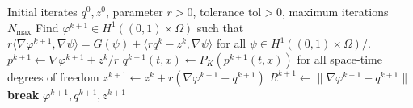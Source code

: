 \begin{algorithm}[H]
\caption{ALG2 for quadratic dynamical optimal transport}
\label{alg:bb_alg2}
\begin{algorithmic}[1]
    \Require Initial iterates $q^0,z^0$, parameter $r>0$,
             tolerance $\mathrm{tol}>0$, maximum iterations $N_{\max}$
        \State Find $\varphi^{k+1}\in H^1((0,1)\times\Omega)$ such that
        \Statex \hspace{1em}$r\langle \nabla\varphi^{k+1},\nabla\psi\rangle
          =G(\psi)+\langle rq^k-z^k,\nabla\psi\rangle$
          for all $\psi\in H^1((0,1)\times\Omega)/$.
        \State $p^{k+1}\gets \nabla\varphi^{k+1}+z^k/r$
        \State $q^{k+1}(t,x)\gets P_K(p^{k+1}(t,x))$
               for all space-time degrees of freedom %
        \State $z^{k+1}\gets z^k+r(\nabla\varphi^{k+1}-q^{k+1})$
        \State $R^{k+1}\gets\|\nabla\varphi^{k+1}-q^{k+1}\|$
            \State \textbf{break}
        \EndIf
    \EndFor
    \Ensure $\varphi^{k+1},q^{k+1},z^{k+1}$
\end{algorithmic}
\end{algorithm}

